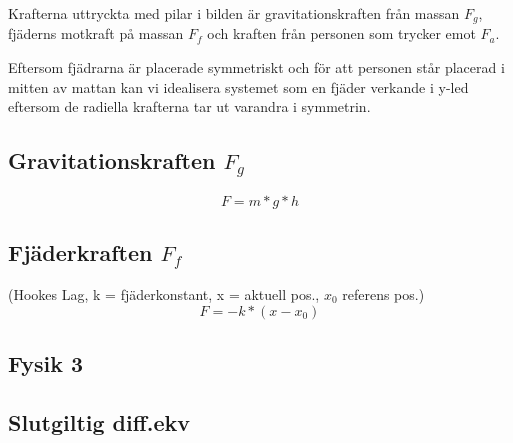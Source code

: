 \documentclass[10pt,a4paper]{article}
\begin{document}
Krafterna uttryckta med pilar i bilden är gravitationskraften från massan $F_g$, fjäderns motkraft på massan $F_f$ och kraften från personen som trycker emot $F_a$.

Eftersom fjädrarna är placerade symmetriskt och för att personen står placerad i mitten av mattan kan vi idealisera systemet som en fjäder verkande i y-led eftersom de radiella krafterna tar ut varandra i symmetrin.

\subsection{Gravitationskraften $F_g$}

\begin{equation}
F = m * g * h
\end{equation}

\subsection{Fjäderkraften $F_f$}

(Hookes Lag, k = fjäderkonstant, x = aktuell pos., $x_0$ referens pos.)
\begin{equation}
F = - k * (x - x_0)
\end{equation}

\subsection{Fysik 3}

\subsection{Slutgiltig diff.ekv}
\end{document}
